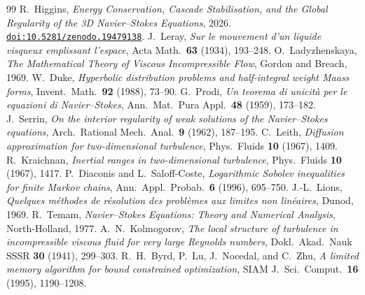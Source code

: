 \documentclass[11pt,a4paper]{article}
\newcommand{\doi}[1]{\href{https://doi.org/#1}{\texttt{doi:#1}}}
\theoremstyle{remark}
\begin{document}
\begin{thebibliography}{99}
 R.~Higgins, \emph{Energy Conservation, Cascade Stabilisation, and the Global Regularity of the 3D Navier--Stokes Equations}, 2026. \doi{10.5281/zenodo.19479138}.
 J.~Leray, \emph{Sur le mouvement d'un liquide visqueux emplissant l'espace}, Acta Math.\ \textbf{63} (1934), 193--248.
 O.~Ladyzhenskaya, \emph{The Mathematical Theory of Viscous Incompressible Flow}, Gordon and Breach, 1969.
 W.~Duke, \emph{Hyperbolic distribution problems and half-integral weight Maass forms}, Invent.\ Math.\ \textbf{92} (1988), 73--90.
 G.~Prodi, \emph{Un teorema di unicit\`a per le equazioni di Navier--Stokes}, Ann.\ Mat.\ Pura Appl.\ \textbf{48} (1959), 173--182.
 J.~Serrin, \emph{On the interior regularity of weak solutions of the Navier--Stokes equations}, Arch.\ Rational Mech.\ Anal.\ \textbf{9} (1962), 187--195.
 C.~Leith, \emph{Diffusion approximation for two-dimensional turbulence}, Phys.\ Fluids \textbf{10} (1967), 1409.
 R.~Kraichnan, \emph{Inertial ranges in two-dimensional turbulence}, Phys.\ Fluids \textbf{10} (1967), 1417.
 P.~Diaconis and L.~Saloff-Coste, \emph{Logarithmic Sobolev inequalities for finite Markov chains}, Ann.\ Appl.\ Probab.\ \textbf{6} (1996), 695--750.
 J.-L.~Lions, \emph{Quelques m\'ethodes de r\'esolution des probl\`emes aux limites non lin\'eaires}, Dunod, 1969.
 R.~Temam, \emph{Navier--Stokes Equations: Theory and Numerical Analysis}, North-Holland, 1977.
 A.~N.~Kolmogorov, \emph{The local structure of turbulence in incompressible viscous fluid for very large Reynolds numbers}, Dokl.\ Akad.\ Nauk SSSR \textbf{30} (1941), 299--303.
 R.~H.~Byrd, P.~Lu, J.~Nocedal, and C.~Zhu, \emph{A limited memory algorithm for bound constrained optimization}, SIAM J.\ Sci.\ Comput.\ \textbf{16} (1995), 1190--1208.
\end{thebibliography}
\end{document}
